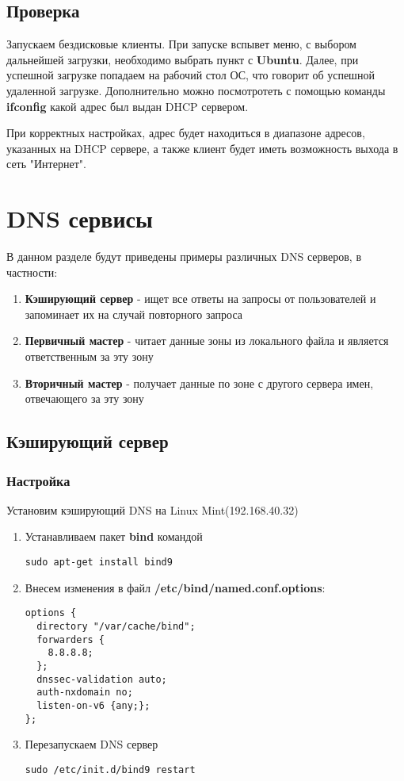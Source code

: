 \documentclass[14pt,a4paper,report]{report}
\begin{document}
\subsection{Проверка}
Запускаем бездисковые клиенты. При запуске вспывет меню, с выбором дальнейшей загрузки, необходимо выбрать пункт с \textbf{Ubuntu}. Далее, при успешной загрузке попадаем на рабочий стол ОС, что говорит об успешной удаленной загрузке. Дополнительно можно посмотротеть с помощью команды \textbf{ifconfig} какой адрес был выдан DHCP сервером. 

При корректных настройках, адрес будет находиться в диапазоне адресов, указанных на DHCP сервере, а также клиент будет иметь возможность выхода в сеть "Интернет".

\section{DNS сервисы}
В данном разделе будут приведены примеры различных DNS серверов, в частности:
\begin{enumerate}
\item \textbf{Кэширующий сервер} - ищет все ответы на запросы от пользователей и запоминает их на случай повторного запроса
\item \textbf{Первичный мастер} - читает данные зоны из локального файла и является ответственным за эту зону
\item \textbf{Вторичный мастер} - получает данные по зоне с другого сервера имен,
отвечающего за эту зону
\end{enumerate}

\subsection{Кэширующий сервер}
\subsubsection{Настройка}
Установим кэширующий DNS на Linux Mint(192.168.40.32)
\begin{enumerate}
\item Устанавливаем пакет \textbf{bind} командой
\begin{lstlisting}[language={}]
sudo apt-get install bind9
\end{lstlisting}
\item Внесем изменения в файл \textbf{/etc/bind/named.conf.options}:
\begin{lstlisting}[language={}]
options {
  directory "/var/cache/bind";
  forwarders {
    8.8.8.8;
  };
  dnssec-validation auto;
  auth-nxdomain no;
  listen-on-v6 {any;};
};
\end{lstlisting}
\item Перезапускаем DNS сервер
\begin{lstlisting}[language={}]
sudo /etc/init.d/bind9 restart
\end{lstlisting}
\end{enumerate}
\end{document}
